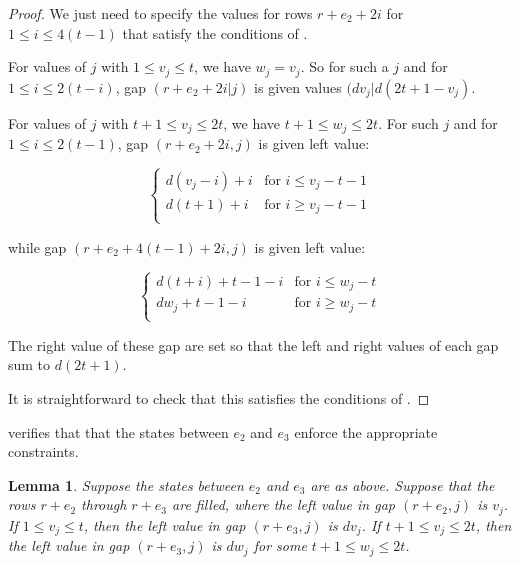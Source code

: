 \documentclass[11pt]{article}
\theoremstyle{plain}
\newtheorem{lemma}[theorem]{Lemma}
\theoremstyle{definition}
\begin{document}
\begin{proof}
We just need to specify the values for rows $r+e_2+2i$ for $1\le i \le 4(t-1)$ that satisfy the conditions of . 

For values of $j$ with $1\le v_j \le t$, we have $w_j=v_j$. So for such a $j$ and for $1\le i\le 2(t-i)$, gap $(r+e_2+2i|j)$ is given values $(dv_j|d(2t+1-v_j)$.

For values of $j$ with $t+1\le v_j\le 2t$, we have $t+1\le w_j\le 2t$. For such $j$ and for $1\le i \le 2(t-1)$, gap $(r+e_2+2i, j)$ is given left value:

\[
\begin{cases}
d(v_j-i)+i&\text{for }i\le v_j-t-1\\
d(t+1)+i&\text{for }i\ge v_j-t-1\\
\end{cases}
\]

\noindent while gap $(r+e_2+4(t-1)+2i, j)$ is given left value:

\[
\begin{cases}
d(t+i)+t-1-i&\text{for }i\le w_j-t\\
dw_j+t-1-i&\text{for }i\ge w_j-t\\
\end{cases}
\]

\noindent The right value of these gap are set so that the left and right values of each gap sum to $d(2t+1)$. 

It is straightforward to check that this satisfies the conditions of .
\end{proof}

 verifies that that the states between $e_2$ and $e_3$ enforce the appropriate constraints.

\begin{lemma}\label{lem:verticalverification}
Suppose the states between $e_2$ and $e_3$ are as above. Suppose that the rows $r+e_2$ through $r+e_3$ are filled, where the left value in gap $(r+e_2, j)$ is $v_j$. If $1\le v_j\le t$, then the left value in gap $(r+e_3, j)$ is $dv_j$. If $t+1\le v_j\le 2t$, then the left value in gap $(r+e_3, j)$ is $dw_j$ for some $t+1\le w_j\le 2t$.
\end{lemma}
\end{document}
